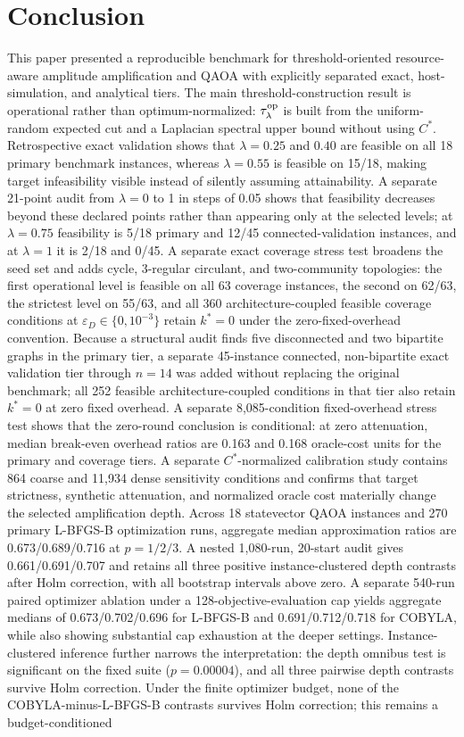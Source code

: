 \documentclass[5p,times]{elsarticle}
\begin{document}
\section{Conclusion}
This paper presented a reproducible benchmark for threshold-oriented resource-aware amplitude amplification and QAOA with explicitly separated exact, host-simulation, and analytical tiers. The main threshold-construction result is operational rather than optimum-normalized: $\tau_\lambda^{\rm op}$ is built from the uniform-random expected cut and a Laplacian spectral upper bound without using $C^*$. Retrospective exact validation shows that $\lambda=0.25$ and $0.40$ are feasible on all 18 primary benchmark instances, whereas $\lambda=0.55$ is feasible on 15/18, making target infeasibility visible instead of silently assuming attainability. A separate 21-point audit from $\lambda=0$ to 1 in steps of 0.05 shows that feasibility decreases beyond these declared points rather than appearing only at the selected levels; at $\lambda=0.75$ feasibility is 5/18 primary and 12/45 connected-validation instances, and at $\lambda=1$ it is 2/18 and 0/45. A separate exact coverage stress test broadens the seed set and adds cycle, 3-regular circulant, and two-community topologies: the first operational level is feasible on all 63 coverage instances, the second on 62/63, the strictest level on 55/63, and all 360 architecture-coupled feasible coverage conditions at $\varepsilon_D\in\{0,10^{-3}\}$ retain $k^*=0$ under the zero-fixed-overhead convention. Because a structural audit finds five disconnected and two bipartite graphs in the primary tier, a separate 45-instance connected, non-bipartite exact validation tier through $n=14$ was added without replacing the original benchmark; all 252 feasible architecture-coupled conditions in that tier also retain $k^*=0$ at zero fixed overhead. A separate 8,085-condition fixed-overhead stress test shows that the zero-round conclusion is conditional: at zero attenuation, median break-even overhead ratios are 0.163 and 0.168 oracle-cost units for the primary and coverage tiers. A separate $C^*$-normalized calibration study contains 864 coarse and 11,934 dense sensitivity conditions and confirms that target strictness, synthetic attenuation, and normalized oracle cost materially change the selected amplification depth. Across 18 statevector QAOA instances and 270 primary L-BFGS-B optimization runs, aggregate median approximation ratios are 0.673/0.689/0.716 at $p=1/2/3$. A nested 1,080-run, 20-start audit gives 0.661/0.691/0.707 and retains all three positive instance-clustered depth contrasts after Holm correction, with all bootstrap intervals above zero. A separate 540-run paired optimizer ablation under a 128-objective-evaluation cap yields aggregate medians of 0.673/0.702/0.696 for L-BFGS-B and 0.691/0.712/0.718 for COBYLA, while also showing substantial cap exhaustion at the deeper settings. Instance-clustered inference further narrows the interpretation: the depth omnibus test is significant on the fixed suite ($p=0.00004$), and all three pairwise depth contrasts survive Holm correction. Under the finite optimizer budget, none of the COBYLA-minus-L-BFGS-B contrasts survives Holm correction; this remains a budget-conditioned 
\end{document}
